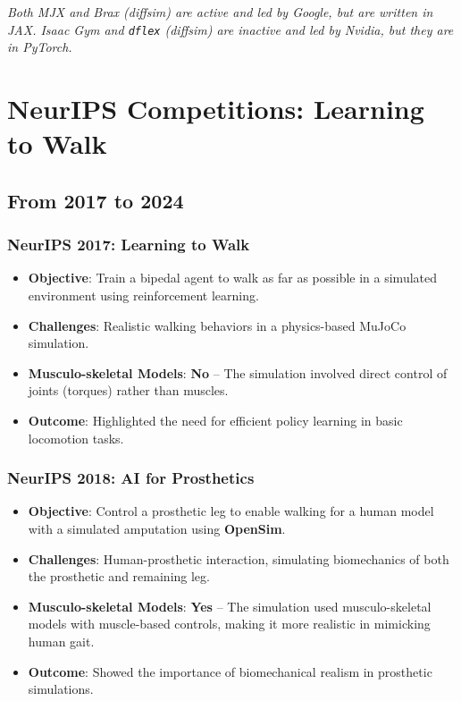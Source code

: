 \documentclass[12pt,a4paper]{article}
\begin{document}
\emph{Both MJX and Brax (diffsim) are active and led by Google, but are written in JAX.
Isaac Gym and \texttt{dflex} (diffsim) are inactive and led by Nvidia, but they are in PyTorch.}

\section{NeurIPS Competitions: Learning to Walk}
\label{s:l2w}

\subsection{From 2017 to 2024}

\subsubsection{NeurIPS 2017: Learning to Walk}

\begin{itemize}
    \item \textbf{Objective}: Train a bipedal agent to walk as far as possible in a simulated
        environment using reinforcement learning.
    \item \textbf{Challenges}: Realistic walking behaviors in a physics-based MuJoCo simulation.
    \item \textbf{Musculo-skeletal Models}: \textbf{No} – The simulation involved direct control
        of joints (torques) rather than muscles.
    \item \textbf{Outcome}: Highlighted the need for efficient policy learning in basic locomotion
        tasks.
\end{itemize}

\subsubsection{NeurIPS 2018: AI for Prosthetics}

\begin{itemize}
    \item \textbf{Objective}: Control a prosthetic leg to enable walking for a human model with a
        simulated amputation using \textbf{OpenSim}.
    \item \textbf{Challenges}: Human-prosthetic interaction, simulating biomechanics of both the
        prosthetic and remaining leg.
    \item \textbf{Musculo-skeletal Models}: \textbf{Yes} – The simulation used musculo-skeletal
        models with muscle-based controls, making it more realistic in mimicking human gait.
    \item \textbf{Outcome}: Showed the importance of biomechanical realism in prosthetic
        simulations.
\end{itemize}
\end{document}
